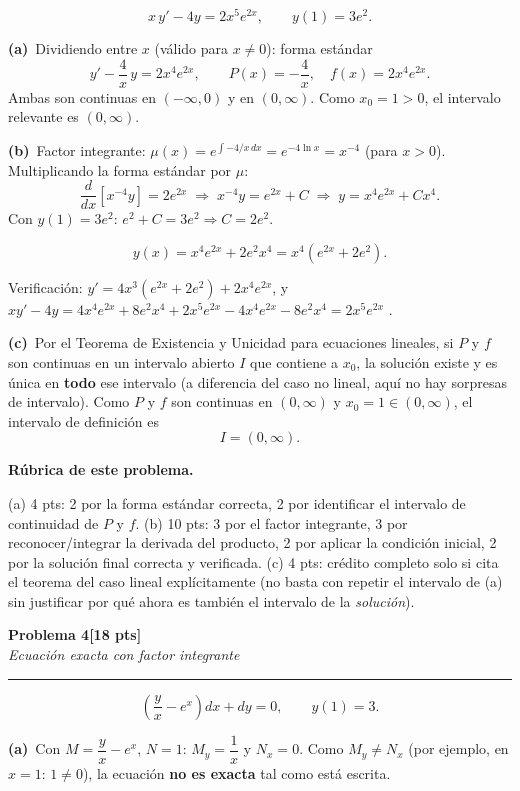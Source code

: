\documentclass[11pt,letterpaper]{article}
\newcommand{\problema}[3]{%
  \bigskip\bigskip\noindent
  {\Large\textbf{Problema #1}}\hfill\textbf{[#2 pts]}\\[3pt]
  {\small\itshape #3}\par
  \vspace{2pt}\hrule\vspace{8pt}
}
\newcommand{\subparte}[2]{%
  \medskip\noindent\textbf{(#1}\ #2\par\smallskip
}
\newenvironment{resultado}
  {\begin{mdframed}[linecolor=black,linewidth=0.6pt,
    innerleftmargin=6pt,innerrightmargin=6pt,innertopmargin=4pt,innerbottommargin=4pt]
   \bfseries}
  {\end{mdframed}}
\newenvironment{rubrica}{%
  \begin{mdframed}[linecolor=black,linewidth=0.6pt,
    innerleftmargin=8pt,innerrightmargin=8pt,innertopmargin=5pt,innerbottommargin=5pt]
  \small\textbf{Rúbrica de este problema.}\par\smallskip
}{\end{mdframed}}
\begin{document}
\[
x\,y' - 4y = 2x^5 e^{2x}, \qquad y(1) = 3e^2.
\]

\subparte{a)}{Dividiendo entre $x$ (válido para $x\neq0$): forma estándar
\[
y' - \frac{4}{x}\,y = 2x^4 e^{2x}, \qquad P(x) = -\frac{4}{x}, \quad f(x)=2x^4e^{2x}.
\]
Ambas son continuas en $(-\infty,0)$ y en $(0,\infty)$. Como $x_0=1>0$, el intervalo relevante es $(0,\infty)$.}

\subparte{b)}{Factor integrante: $\mu(x) = e^{\int -4/x\,dx} = e^{-4\ln x} = x^{-4}$ (para $x>0$).
Multiplicando la forma estándar por $\mu$:
\[
\frac{d}{dx}\left[x^{-4}y\right] = 2e^{2x} \;\Longrightarrow\; x^{-4}y = e^{2x} + C \;\Longrightarrow\; y = x^4e^{2x} + Cx^4.
\]
Con $y(1)=3e^2$: $e^2 + C = 3e^2 \Rightarrow C = 2e^2$.
\begin{resultado}
\[
y(x) = x^4 e^{2x} + 2e^2 x^4 = x^4\!\left(e^{2x}+2e^2\right).
\]
\end{resultado}
Verificación: $y' = 4x^3(e^{2x}+2e^2)+2x^4e^{2x}$, y $xy'-4y = 4x^4e^{2x}+8e^2x^4+2x^5e^{2x}-4x^4e^{2x}-8e^2x^4 = 2x^5e^{2x}$ \checkmark.}

\subparte{c)}{Por el Teorema de Existencia y Unicidad para ecuaciones lineales, si $P$ y $f$ son continuas en un intervalo abierto $I$ que contiene a $x_0$, la solución existe y es única en \textbf{todo} ese intervalo (a diferencia del caso no lineal, aquí no hay sorpresas de intervalo). Como $P$ y $f$ son continuas en $(0,\infty)$ y $x_0=1 \in (0,\infty)$, el intervalo de definición es
\[
I = (0,\infty).
\]}

\begin{rubrica}
(a) 4 pts: 2 por la forma estándar correcta, 2 por identificar el intervalo de continuidad de $P$ y $f$. (b) 10 pts: 3 por el factor integrante, 3 por reconocer/integrar la derivada del producto, 2 por aplicar la condición inicial, 2 por la solución final correcta y verificada. (c) 4 pts: crédito completo solo si cita el teorema del caso lineal explícitamente (no basta con repetir el intervalo de (a) sin justificar por qué ahora es también el intervalo de la \emph{solución}).
\end{rubrica}

\newpage
\problema{4}{18}{Ecuación exacta con factor integrante}

\[
\left(\frac{y}{x}-e^x\right) dx + dy = 0, \qquad y(1)=3.
\]

\subparte{a)}{Con $M=\dfrac{y}{x}-e^x$, $N=1$: $M_y = \dfrac{1}{x}$ y $N_x = 0$. Como $M_y \neq N_x$ (por ejemplo, en $x=1$: $1 \neq 0$), la ecuación \textbf{no es exacta} tal como está escrita.}
\end{document}
